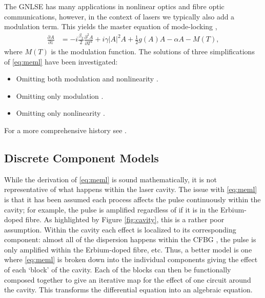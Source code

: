 \documentclass[graybox]{svmult}
\newcommand{\pdiff}[3][]{\frac{\partial^{#1}#2}{\partial{#3}^{#1}}}
\begin{document}
The GNLSE has many applications in nonlinear optics and fibre optic communications, however, in the context of lasers we typically also add a modulation term. This yields the master equation of mode-locking \cite{haus1975, hausbook, haus1986, haus1992, haus2000, kartner, tamura1996, usechak},
\begin{align}
	\pdiff{A}{z} &= - i \frac{\beta_2}{2}\pdiff[2]{A}{T} + i \gamma |A|^2 A + \frac{1}{2}g(A) A - \alpha A - M(T),
	\label{eq:meml}
\end{align}
where $M(T)$ is the modulation function. The solutions of three simplifications of \eqref{eq:meml} have been investigated:
\begin{itemize}
	\item Omitting both modulation and nonlinearity \cite{haus1975, haus1986, haus1992}.
	\item Omitting only modulation \cite{haus1991, usechak}.
	\item Omitting only nonlinearity  \cite{burgoyne2014, haus1975, hausbook, haus1996, haus2000, kartner, tamura1996, usechak}.
\end{itemize}
For a more comprehensive history see \cite{haus2000}.

\subsection{Discrete Component Models}
While the derivation of \eqref{eq:meml} is sound mathematically, it is not representative of what happens within the laser cavity. The issue with \eqref{eq:meml} is that it has been assumed each process affects the pulse continuously within the cavity; for example, the pulse is amplified regardless of if it is in the Erbium-doped fibre. As highlighted by Figure \ref{fig:cavity}, this is a rather poor assumption. Within the cavity each effect is localized to its corresponding component: almost all of the dispersion happens within the CFBG \cite{agrawal2002}, the pulse is only amplified within the Erbium-doped fibre, etc. Thus, a better model is one where \eqref{eq:meml} is broken down into the individual components giving the effect of each `block' of the cavity. Each of the blocks can then be functionally composed together to give an iterative map for the effect of one circuit around the cavity. This transforms the differential equation into an algebraic equation.
%	
\end{document}

